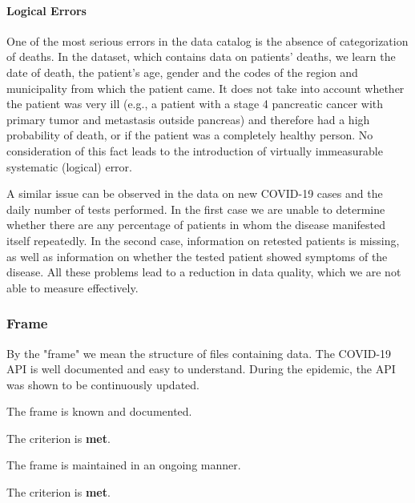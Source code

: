 \paragraph{Logical Errors} One of the most serious errors in the data catalog is the absence of categorization of deaths.
In the dataset, which contains data on patients' deaths, we learn the date of death, the patient's age, gender and the codes of the region and municipality from which the patient came.
It does not take into account whether the patient was very ill (e.g., a patient with a stage 4 pancreatic cancer with primary tumor and metastasis outside pancreas) and therefore had a high probability of death, or if the patient was a completely healthy person.
No consideration of this fact leads to the introduction of virtually immeasurable systematic (logical) error.

A similar issue can be observed in the data on new COVID-19 cases and the daily number of tests performed.
In the first case we are unable to determine whether there are any percentage of patients in whom the disease manifested itself repeatedly.
In the second case, information on retested patients is missing, as well as information on whether the tested patient showed symptoms of the disease.
All these problems lead to a reduction in data quality, which we are not able to measure effectively.

\subsubsection{Frame}

By the "frame" we mean the structure of files containing data.
The COVID-19 API is well documented and easy to understand.
During the epidemic, the API was shown to be continuously updated.

\begin{QandA}
    \item The frame is known and documented.
    \begin{answered}
        The criterion is \textbf{met}.
    \end{answered}

    \item The frame is maintained in an ongoing manner.
    \begin{answered}
        The criterion is \textbf{met}.
    \end{answered}

\end{QandA}

